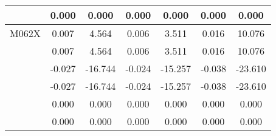 \begin{tabular}{|c| c |c | c | c | c | c |}
                                                                                   & 0.000                                            & 0.000                                        & 0.000                                            & 0.000                                      & 0.000                                            & 0.000                  \\ \hline
    \multicolumn{1}{|c|}{ M062X}                               & 0.007                                            & 4.564                                        & 0.006                                            & 3.511                                      & 0.016                                            & 10.076                 \\ \hline
                                                                                   & 0.007                                            & 4.564                                        & 0.006                                            & 3.511                                      & 0.016                                            & 10.076                 \\ \hline
                                                                                   & -0.027                                           & -16.744                                      & -0.024                                           & -15.257                                    & -0.038                                           & -23.610                \\ \hline
                                                                                   &   -0.027 & -16.744                                      &   -0.024 & -15.257                                    &   -0.038 & -23.610                \\ \hline
                                                                                   & 0.000                                            & 0.000                                        & 0.000                                            & 0.000                                      & 0.000                                            & 0.000                  \\ \hline
                                                                                   & 0.000                                            & 0.000                                        & 0.000                                            & 0.000                                      & 0.000                                            & 0.000                  \\ \hline

\end{tabular}
